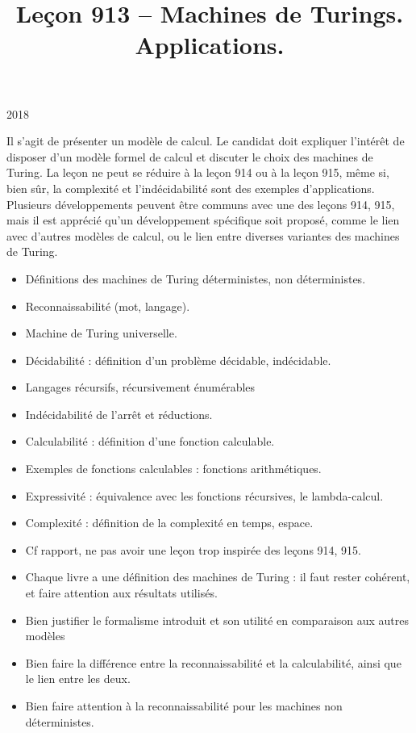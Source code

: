 \documentclass{agregfiche}
\title{Leçon 913 -- Machines de Turings. Applications.}
\begin{document}
\maketitle

\secrapports

\begin{rapport}{2018}

Il s'agit de présenter un modèle de calcul.
Le candidat doit expliquer l'intérêt de disposer d'un modèle formel de calcul et discuter le choix des machines de Turing.
La leçon ne peut se réduire à la leçon 914 ou à la leçon 915, même si, bien sûr, la complexité et l'indécidabilité sont des exemples d'applications.
Plusieurs développements peuvent être communs avec une des leçons 914, 915, mais il est apprécié qu'un développement spécifique soit proposé, comme le lien avec d'autres modèles de calcul, ou le lien entre diverses variantes des machines de Turing.

\end{rapport}

\secindispensables

\begin{itemize}
    \item Définitions des machines de Turing déterministes, non déterministes.
    \item Reconnaissabilité (mot, langage).
    \item Machine de Turing universelle.
    \item Décidabilité : définition d'un problème décidable, indécidable.
    \item Langages récursifs, récursivement énumérables
    \item Indécidabilité de l'arrêt et réductions.
    \item Calculabilité : définition d'une fonction calculable.
    \item Exemples de fonctions calculables : fonctions arithmétiques.
    \item Expressivité : équivalence avec les fonctions récursives, le lambda-calcul.
    \item Complexité : définition de la complexité en temps, espace.
\end{itemize}

\secpieges

\begin{itemize}
    \item Cf rapport, ne pas avoir une leçon trop inspirée des leçons 914, 915.
    \item Chaque livre a une définition des machines de Turing : il faut rester cohérent, et faire attention aux résultats utilisés.
    \item Bien justifier le formalisme introduit et son utilité en comparaison
        aux autres modèles
    \item Bien faire la différence entre la reconnaissabilité et la
        calculabilité, ainsi que le lien entre les deux.
    \item Bien faire attention à la reconnaissabilité pour les machines 
        non déterministes.
\end{itemize}
\end{document}
